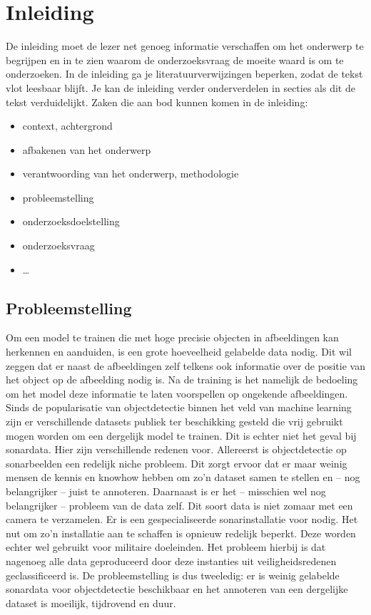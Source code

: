 
\chapter{Inleiding}%
\label{ch:inleiding}

De inleiding moet de lezer net genoeg informatie verschaffen om het onderwerp te begrijpen en in te zien waarom de onderzoeksvraag de moeite waard is om te onderzoeken. In de inleiding ga je literatuurverwijzingen beperken, zodat de tekst vlot leesbaar blijft. Je kan de inleiding verder onderverdelen in secties als dit de tekst verduidelijkt. Zaken die aan bod kunnen komen in de inleiding:

\begin{itemize}
  \item context, achtergrond
  \item afbakenen van het onderwerp
  \item verantwoording van het onderwerp, methodologie
  \item probleemstelling
  \item onderzoeksdoelstelling
  \item onderzoeksvraag
  \item \ldots
\end{itemize}

\section{Probleemstelling}%
\label{sec:probleemstelling}

Om een model te trainen die met hoge precisie objecten in afbeeldingen kan herkennen en aanduiden, is een grote hoeveelheid gelabelde data nodig. Dit wil zeggen dat er naast de afbeeldingen zelf telkens ook informatie over de positie van het object op de afbeelding nodig is. Na de training is het namelijk de bedoeling om het model deze informatie te laten voorspellen op ongekende afbeeldingen. Sinds de popularisatie van objectdetectie binnen het veld van machine learning zijn er verschillende datasets publiek ter beschikking gesteld die vrij gebruikt mogen worden om een dergelijk model te trainen. Dit is echter niet het geval bij sonardata. Hier zijn verschillende redenen voor. Allereerst is objectdetectie op sonarbeelden een redelijk niche probleem. Dit zorgt ervoor dat er maar weinig mensen de kennis en knowhow hebben om zo'n dataset samen te stellen en -- nog belangrijker -- juist te annoteren. Daarnaast is er het -- misschien wel nog belangrijker -- probleem van de data zelf. Dit soort data is niet zomaar met een camera te verzamelen. Er is een gespecialiseerde sonarinstallatie voor nodig. Het nut om zo'n installatie aan te schaffen is opnieuw redelijk beperkt. Deze worden echter wel gebruikt voor militaire doeleinden. Het probleem hierbij is dat nagenoeg alle data geproduceerd door deze instanties uit veiligheidsredenen geclassificeerd is. De probleemstelling is dus tweeledig: er is weinig gelabelde sonardata voor objectdetectie beschikbaar en het annoteren van een dergelijke dataset is moeilijk, tijdrovend en duur.

